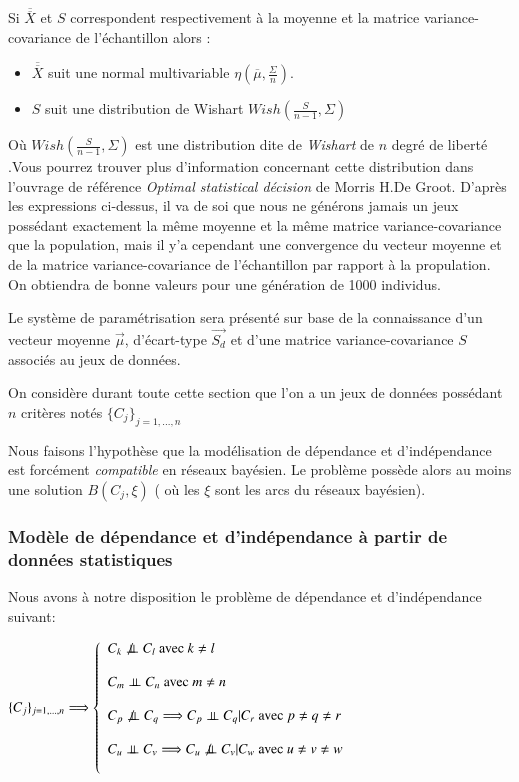 \documentclass[a4paper]{article}
\begin{document}
Si $\overline{\overline{X}}$ et $S$ correspondent respectivement à la moyenne et la matrice variance-covariance de l'échantillon alors :
\begin{itemize}
  \item $\overline{\overline{X}}$ suit une normal multivariable $\eta(\overline{\mu},\frac{\Sigma}{n})$.
  \item $S$ suit une distribution de Wishart $Wish(\frac{S}{n-1},\Sigma)$
\end{itemize}

Où $Wish(\frac{S}{n-1},\Sigma)$ est une distribution dite de \textit{Wishart} de $n$ degré de liberté .Vous pourrez trouver plus d'information concernant cette distribution dans l'ouvrage de référence \textit{Optimal statistical décision} de Morris H.De Groot.
D'après les expressions ci-dessus, il va de soi que nous ne générons jamais   un jeux possédant exactement la même moyenne et la même matrice variance-covariance  que la population, mais il y'a cependant  une convergence du vecteur moyenne et de la matrice variance-covariance de l'échantillon par rapport à la propulation. On obtiendra de bonne valeurs pour une génération de 1000 individus.

Le système de paramétrisation sera présenté sur base de la connaissance d'un vecteur moyenne  $\vec{\mu}$, d'écart-type $\vec{S_{d}}$ et d'une matrice variance-covariance $S$ associés au jeux de données. 






On considère durant toute cette section que l'on a un jeux de données possédant $n$ critères notés $\{C_{j}\}_{j=1,...,n}$

Nous faisons l'hypothèse que la modélisation de dépendance et d'indépendance est forcément \textit{compatible} en réseaux bayésien. 
Le problème possède alors au moins une solution $B(C_{j},\xi)$ ( où les $\xi$ sont les arcs du réseaux bayésien).

\newpage
\subsubsection{Modèle de dépendance et d'indépendance à partir de données statistiques}

Nous avons à notre disposition le problème de dépendance et d'indépendance suivant:

$\{C_{j}\}_{j=1,...,n}\Longrightarrow\left\lbrace 
\begin{array}{lcl} 
C_{k} \not\ci C_{l} \text{     avec } k \ne l\\ \\
C_{m} \ci C_{n} \text{     avec } m\ne n\\ \\
C_{p}\not\ci C_{q} \Longrightarrow C_{p}\ci C_{q}|C_{r} \text{   avec  }  p\ne q\ne r      \\ \\
C_{u}\ci C_{v} \Longrightarrow C_{u}\not\ci C_{v}|C_{w}\text{   avec } u\ne v\ne w\\ \\   
 \end{array}\right.$
\end{document}
